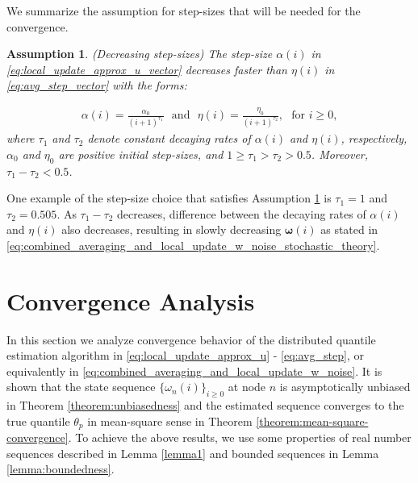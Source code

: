 \documentclass[journal]{IEEEtran}
\newtheorem{assumption}{Assumption}
\begin{document}
We summarize the assumption for step-sizes that will be needed for the convergence. 


\begin{assumption}
	(Decreasing step-sizes) The step-size $\alpha(i)$ in \eqref{eq:local_update_approx_u_vector} decreases faster than $\eta(i)$ in \eqref{eq:avg_step_vector} with the forms:
	
	\vspace{-4mm}
	\small
	\begin{align}
	\alpha(i) = \frac{\alpha_0}{(i+1)^{\tau_1}}\,\,\,\,\text{and}\,\,\,\,\eta(i) = \frac{\eta_0}{(i+1)^{\tau_2}},\,\,\,\,\text{for}\,\,i\ge 0, \label{eq:step_size_forms}
	\end{align}
	\normalsize
	where $\tau_1$ and $\tau_2$ denote constant decaying rates of $\alpha(i)$ and $\eta(i)$, respectively, $\alpha_0$ and $\eta_0$ are positive initial step-sizes, and $1 \ge \tau_1 > \tau_2 > 0.5$. Moreover, $\tau_1 - \tau_2 < 0.5$. \label{assumption:stepSizes}
\end{assumption}
One example of the step-size choice that satisfies Assumption \ref{assumption:stepSizes} is $\tau_1 = 1$ and $\tau_2 = 0.505$. As $\tau_1 - \tau_2$ decreases, difference between the decaying rates of $\alpha(i)$ and $\eta(i)$ also decreases, resulting in slowly decreasing {}{$\bm{\omega}(i)$ as stated in \eqref{eq:combined_averaging_and_local_update_w_noise_stochastic_theory}.}



\vspace{-2mm}
\section{Convergence Analysis} \label{convergence_analysis}
In this section we analyze convergence behavior of the distributed quantile estimation algorithm in \eqref{eq:local_update_approx_u} - \eqref{eq:avg_step}, or equivalently in \eqref{eq:combined_averaging_and_local_update_w_noise}. It is shown that the state sequence $\{\omega_n(i)\}_{i \ge 0}$ at node $n$ is asymptotically unbiased in Theorem \ref{theorem:unbiasedness} and the estimated sequence converges to the true quantile $\theta_p$ in mean-square sense in Theorem \ref{theorem:mean-square-convergence}. To achieve the above results, we use some properties of real number sequences described in Lemma \ref{lemma1} and bounded sequences in Lemma \ref{lemma:boundedness}.
\end{document}
